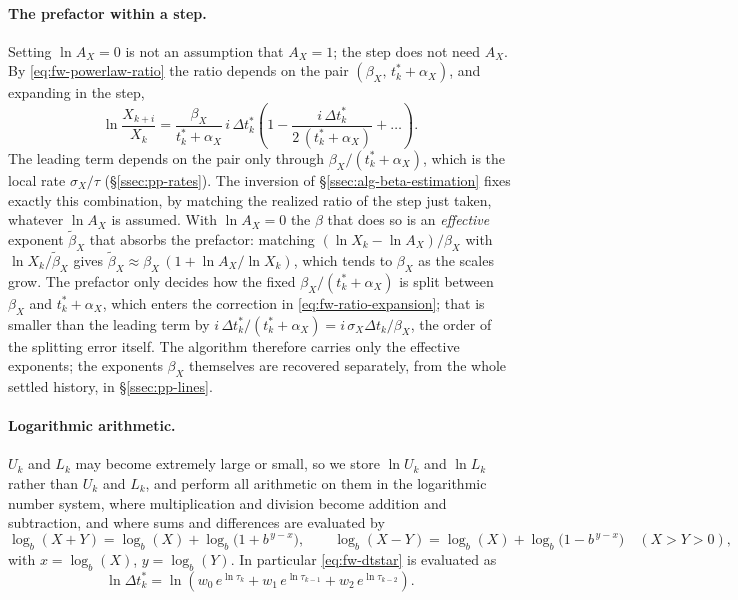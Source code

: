 \documentclass{article}
\begin{document}
\paragraph{The prefactor within a step.}
Setting $\ln A_X = 0$ is not an assumption that $A_X = 1$; the step does
not need $A_X$. By \eqref{eq:fw-powerlaw-ratio} the ratio depends on the
pair $(\beta_X,\, t_k^* + \alpha_X)$, and expanding in the step,
\begin{equation}\label{eq:fw-ratio-expansion}
  \ln \frac{X_{k+i}}{X_k}
  = \frac{\beta_X}{t_k^* + \alpha_X}\, i\, \Delta t_k^*
    \left( 1 - \frac{i\, \Delta t_k^*}{2\,(t_k^* + \alpha_X)} + \dots \right).
\end{equation}
The leading term depends on the pair only through
$\beta_X / (t_k^* + \alpha_X)$, which is the local rate $\sigma_X/\tau$
(\S\ref{ssec:pp-rates}). The inversion of \S\ref{ssec:alg-beta-estimation}
fixes exactly this combination, by matching the realized ratio of the step
just taken, whatever $\ln A_X$ is assumed. With $\ln A_X = 0$ the $\beta$
that does so is an \emph{effective} exponent $\tilde\beta_X$ that absorbs
the prefactor: matching $(\ln X_k - \ln A_X)/\beta_X$ with
$\ln X_k / \tilde\beta_X$ gives
$\tilde\beta_X \approx \beta_X\, (1 + \ln A_X / \ln X_k)$, which tends to
$\beta_X$ as the scales grow. The prefactor only decides how the fixed
$\beta_X/(t_k^*+\alpha_X)$ is split between $\beta_X$ and $t_k^* + \alpha_X$,
which enters the correction in \eqref{eq:fw-ratio-expansion}; that is
smaller than the leading term by
$i\,\Delta t_k^*/(t_k^*+\alpha_X) = i\, \sigma_X \Delta t_k / \beta_X$,
the order of the splitting error itself. The algorithm therefore carries only
the effective exponents; the exponents $\beta_X$ themselves are recovered
separately, from the whole settled history, in \S\ref{ssec:pp-lines}.

\paragraph{Logarithmic arithmetic.}
$U_k$ and $L_k$ may become extremely large or small, so we store
$\ln U_k$ and $\ln L_k$ rather than $U_k$ and $L_k$, and perform all
arithmetic on them in the logarithmic number system, where multiplication and
division become addition and subtraction, and where sums and differences are
evaluated by
\begin{equation}\label{eq:fw-log-sum-exp}
  \log_b(X+Y) = \log_b(X) + \log_b\!\bigl(1+b^{\,y-x}\bigr),
  \qquad
  \log_b(X-Y) = \log_b(X) + \log_b\!\bigl(1-b^{\,y-x}\bigr) \quad (X>Y>0),
\end{equation}
with $x = \log_b(X)$, $y = \log_b(Y)$. In particular
\eqref{eq:fw-dtstar} is evaluated as
\begin{equation}\label{eq:fw-ln-dtstar}
  \ln \Delta t_k^* =
  \ln\!\left( w_0\, e^{\ln \tau_k} + w_1\, e^{\ln \tau_{k-1}} + w_2\, e^{\ln \tau_{k-2}} \right).
\end{equation}
\end{document}
